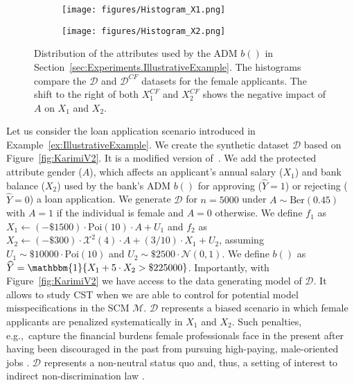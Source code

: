 %
\begin{figure}[t]
    \centering
    \begin{subfigure}{.45\linewidth}
    \texttt{[image: figures/Histogram\_X1.png]}
    \end{subfigure}
    \hfill
    \begin{subfigure}{.45\linewidth}
    \texttt{[image: figures/Histogram\_X2.png]}
    \end{subfigure}
\caption{Distribution of the attributes used by the ADM $b()$ in Section~\ref{sec:Experiments.IllustrativeExample}. The histograms compare the $\mathcal{D}$ and $\mathcal{D}^{CF}$ datasets for the female applicants. The shift to the right of both $X_1^{CF}$ and $X_2^{CF}$ shows the negative impact of $A$ on $X_1$ and $X_2$.}
\label{fig:LoanApp_Distributions}
\end{figure}
%

Let us consider the loan application scenario introduced in Example~\ref{ex:IllustrativeExample}.
We create the synthetic dataset $\mathcal{D}$ based on Figure~\ref{fig:KarimiV2}. 
It is a modified version of~\textcite[Figure 1]{Karimi2021_AlgoRecourse}. 
We add the protected attribute gender ($A$), which affects an applicant's annual salary ($X_1$) and bank balance ($X_2$) used by the bank's ADM $b()$ for approving ($\widehat{Y}=1$) or rejecting ($\widehat{Y}=0$) a loan application.
%
We generate $\mathcal{D}$ for $n=5000$ under $A \sim \text{Ber}(0.45)$ with $A=1$ if the individual is female and $A=0$ otherwise.
We define $f_1$ as $X_1 \leftarrow (-\$1500) \cdot \text{Poi}(10) \cdot A + U_1$ and $f_2$ as $X_2 \leftarrow (-\$300) \cdot \mathcal{X}^2(4) \cdot A + (3/10) \cdot X_1 + U_2$, assuming $U_1 \sim \$10000 \cdot \text{Poi}(10)$ and $U_2 \sim \$2500 \cdot \mathcal{N}(0, 1)$.
We define $b()$ as $\widehat{Y} = \mathbbm{1}\{ X_1 + 5 \cdot X_2 > \$225000\}$.
%
Importantly,
with Figure~\ref{fig:KarimiV2} we have access to the data generating model of $\mathcal{D}$.
It allows to study CST when we are able to control for potential model misspecifications in the SCM $\mathcal{M}$. 
$\mathcal{D}$ represents a biased scenario in which female applicants are penalized systematically in $X_1$ and $X_2$. Such penalties, e.g.,~capture the financial burdens female professionals face in the present after having been discouraged in the past from pursuing high-paying, male-oriented jobs \parencite{CriadoPerez2019InvisibleWomen}.
$\mathcal{D}$ represents a non-neutral status quo and, thus, a setting of interest to indirect non-discrimination law \parencite{Wachter2020BiasPreserving}.

